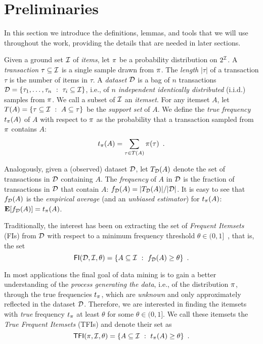 \section{Preliminaries}\label{sec:prelims}
In this section we introduce the definitions, lemmas, and tools that we will use
throughout the work, providing the details that are needed in later sections.

Given a ground set ${\cal I}$ of \emph{items}, let $\pi$ be a
probability distribution on $2^{{\cal I}}$. A \emph{transaction} $\tau\subseteq{\cal I}$
is a single sample drawn from $\pi$. The \emph{length} $|\tau|$ of
a transaction $\tau$ is the number of items in $\tau$.
A \emph{dataset}
${\cal D}$ is a bag of $n$ transactions ${\cal D}=\{\tau_1,\dots,\tau_n ~:~
\tau_i\subseteq{\cal I}\}$, i.e., of $n$
\emph{independent identically distributed} (i.i.d.) samples from $\pi$. We
call a subset of ${\cal I}$ an \emph{itemset}. For any itemset $A$, let
$T(A)=\{\tau\subseteq{\cal I} ~:~ A\subseteq \tau\}$ be the \emph{support set}
of $A$. %
We define the
\emph{true frequency} $t_\pi(A)$ of $A$ with respect to $\pi$ as the
probability that a transaction sampled from $\pi$ contains $A$:
\[
t_\pi(A) = \sum_{\tau\in T(A)}\pi(\tau)\enspace.
\]


Analogously, given a (observed) dataset ${\cal D}$, let $T_{\cal D}(A)$ denote
the set of transactions in ${\cal D}$ containing $A$. The \emph{frequency} of $A$
in ${\cal D}$ is the fraction of transactions in ${\cal D}$ that contain $A$: $f_{\cal D}(A)=
|T_{\cal D}(A)|/|{\cal D}|$. It is easy to see that $f_{\cal D}(A)$ is the
\emph{empirical average} (and an \emph{unbiased estimator}) for $t_\pi(A)$:
${\mathbf E}[f_{\cal D}(A)]=t_\pi(A)$.

Traditionally, the interest has been on extracting the set
of \emph{Frequent Itemsets} (FIs) from ${\cal D}$ with respect to a minimum frequency
threshold $\theta\in(0,1]$~\citep{AgrawalIS93}, that is, the set 
\[
\mathsf{FI}({\cal D},{\cal I},\theta)=\{A\subseteq{\cal I} ~:~ f_{\cal D}(A)\ge\theta\}\enspace.\]

In most applications the final goal of data mining is to gain a better
understanding of the \emph{process generating the data}, i.e., of the
distribution $\pi$, through the true frequencies $t_\pi$, which are
\emph{unknown} and only approximately reflected in the dataset ${\cal D}$. Therefore, %
we are interested in finding the itemsets with \emph{true} frequency
$t_\pi$ at least $\theta$ for some $\theta\in(0,1]$. We call these itemsets the
\emph{True Frequent Itemsets} (TFIs) and denote their set as %
\[
\mathsf{TFI}(\pi,{\cal I},\theta)=\{A\subseteq{\cal I} ~:~ t_\pi(A)\ge\theta\}\enspace.\]

